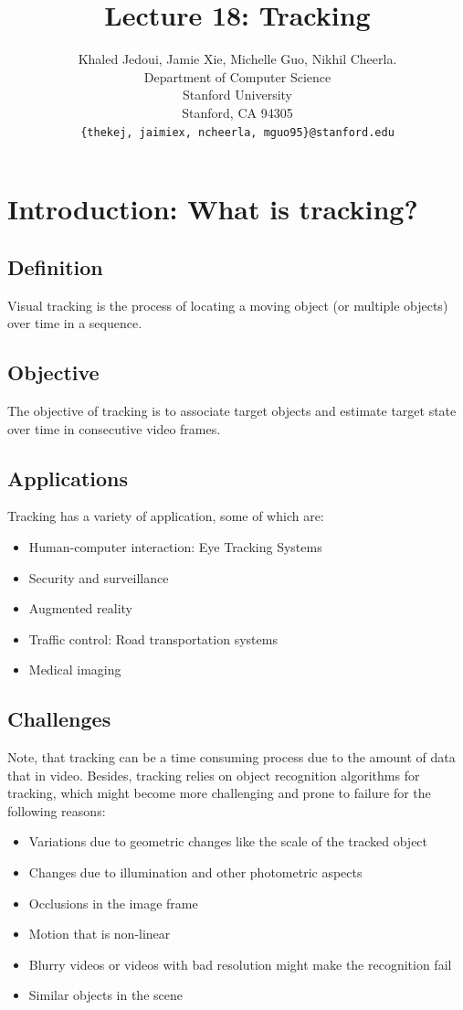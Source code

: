 \documentclass{article}
\title{Lecture 18: Tracking}
\author{
  Khaled Jedoui, Jamie Xie, Michelle Guo, Nikhil Cheerla. \\
  Department of Computer Science\\
  Stanford University\\
  Stanford, CA 94305 \\
  \texttt{\{thekej, jaimiex, ncheerla, mguo95\}@stanford.edu} \\
}
\begin{document}
\maketitle

\section{Introduction: What is tracking?}

\subsection{Definition}

Visual tracking is the process of locating a moving object (or multiple objects) over time in a sequence. 

\subsection{Objective}

The objective of tracking is to associate target objects and estimate target state over time in consecutive video frames.

\subsection{Applications}
Tracking has a variety of application, some of which are:
\begin{itemize}
\item Human-computer interaction: Eye Tracking Systems\cite{7456615}
\item Security and surveillance\cite{1406476}
\item Augmented reality\cite{1634325}
\item Traffic control: Road transportation systems\cite{4054748}
\item Medical imaging\cite{5484176}
\end{itemize}

\subsection{Challenges}

Note, that tracking can be a time consuming process due to the amount of data that in video.
Besides, tracking relies on object recognition algorithms for tracking, which might become more challenging and prone to failure for the following reasons:

\begin{itemize}
\item Variations due to geometric changes like the scale of the tracked object
\item Changes due to illumination and other photometric aspects	
\item Occlusions in the image frame	
\item Motion that is non-linear	
\item Blurry videos or videos with bad resolution might make the recognition fail	
\item Similar objects in the scene
\end{itemize}
\end{document}
